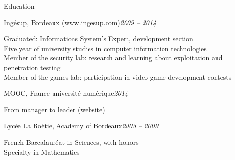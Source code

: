 \begin{rSection}{Education}

  \begin{rSubsection}{Ing\'{e}sup, Bordeaux (\href{www.ingesup.com}{www.ingesup.com})}{\em 2009 -- 2014}{}{}
    \item[] Graduated: Informations System's Expert, development section \\
    Five year of university studies in computer information technologies \\
    Member of the security lab: research and learning about exploitation and penetration testing \\
    Member of the games lab: participation in video game development contests
  \end{rSubsection}

  \begin{rSubsection}{MOOC, France universit\'{e} num\'{e}rique}{\em 2014}{}{}
    \item[] From manager to leader (\href{https://www.france-universite-numerique-mooc.fr/courses/CNAM/01002/Trimestre_1_2014/about}{website})
  \end{rSubsection}

  \begin{rSubsection}{Lyc\'{e}e La Bo\'{e}tie, Academy of Bordeaux}{\em 2005 -- 2009}{}{}
    \item[] French Baccalaur\'{e}at in Sciences, with honors \\
    Specialty in Mathematics
  \end{rSubsection}

\end{rSection}
